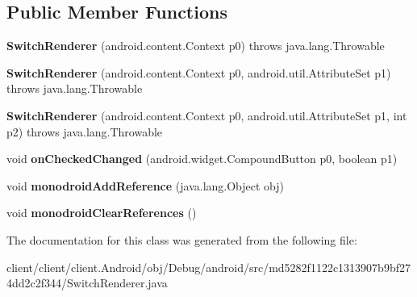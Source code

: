 \subsection*{Public Member Functions}
\begin{DoxyCompactItemize}
\item 
\hypertarget{classmd5282f1122c1313907b9bf274dd2c2f344_1_1SwitchRenderer_a60f4cec82bb49e84e4ac6fe6ff1e4abb}{}{\bfseries Switch\+Renderer} (android.\+content.\+Context p0)  throws java.\+lang.\+Throwable 	\label{classmd5282f1122c1313907b9bf274dd2c2f344_1_1SwitchRenderer_a60f4cec82bb49e84e4ac6fe6ff1e4abb}

\item 
\hypertarget{classmd5282f1122c1313907b9bf274dd2c2f344_1_1SwitchRenderer_ac4e47bbdd85c7c741d83e7dd8f5c10d1}{}{\bfseries Switch\+Renderer} (android.\+content.\+Context p0, android.\+util.\+Attribute\+Set p1)  throws java.\+lang.\+Throwable 	\label{classmd5282f1122c1313907b9bf274dd2c2f344_1_1SwitchRenderer_ac4e47bbdd85c7c741d83e7dd8f5c10d1}

\item 
\hypertarget{classmd5282f1122c1313907b9bf274dd2c2f344_1_1SwitchRenderer_a01712c01ec8cdf5a70f426fda3bbfb29}{}{\bfseries Switch\+Renderer} (android.\+content.\+Context p0, android.\+util.\+Attribute\+Set p1, int p2)  throws java.\+lang.\+Throwable 	\label{classmd5282f1122c1313907b9bf274dd2c2f344_1_1SwitchRenderer_a01712c01ec8cdf5a70f426fda3bbfb29}

\item 
\hypertarget{classmd5282f1122c1313907b9bf274dd2c2f344_1_1SwitchRenderer_a857de771005d28749bac0f5ae3817825}{}void {\bfseries on\+Checked\+Changed} (android.\+widget.\+Compound\+Button p0, boolean p1)\label{classmd5282f1122c1313907b9bf274dd2c2f344_1_1SwitchRenderer_a857de771005d28749bac0f5ae3817825}

\item 
\hypertarget{classmd5282f1122c1313907b9bf274dd2c2f344_1_1SwitchRenderer_a2705edf5e10b2f225b7f6d5a1a1528f9}{}void {\bfseries monodroid\+Add\+Reference} (java.\+lang.\+Object obj)\label{classmd5282f1122c1313907b9bf274dd2c2f344_1_1SwitchRenderer_a2705edf5e10b2f225b7f6d5a1a1528f9}

\item 
\hypertarget{classmd5282f1122c1313907b9bf274dd2c2f344_1_1SwitchRenderer_a189e29d419000646611143720cff8c20}{}void {\bfseries monodroid\+Clear\+References} ()\label{classmd5282f1122c1313907b9bf274dd2c2f344_1_1SwitchRenderer_a189e29d419000646611143720cff8c20}

\end{DoxyCompactItemize}


The documentation for this class was generated from the following file\+:\begin{DoxyCompactItemize}
\item 
client/client/client.\+Android/obj/\+Debug/android/src/md5282f1122c1313907b9bf274dd2c2f344/Switch\+Renderer.\+java\end{DoxyCompactItemize}
